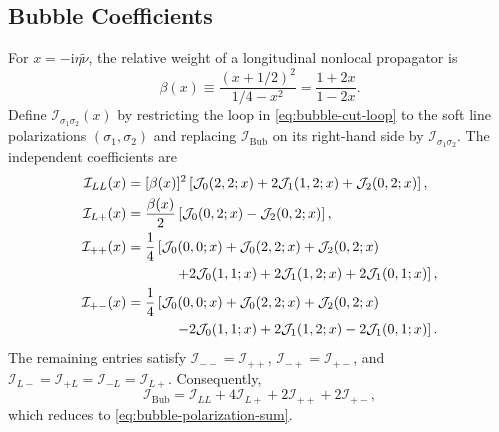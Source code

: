 \documentclass[a4paper,12pt]{article}
\def\ii{\mathrm{i}}
\begin{document}
\subsection{Bubble Coefficients}
\label{app:bubble-polarizations}
For $x=-\ii\eta\tilde\nu$, the relative weight of a longitudinal nonlocal propagator is
\begin{equation}
    \beta(x)\equiv\frac{(x+1/2)^2}{1/4-x^2}
    =\frac{1+2x}{1-2x}.
    \label{eq:bubble-longitudinal-weight}
\end{equation}
Define $\mathcal I_{\sigma_1\sigma_2}(x)$ by restricting the loop in \eqref{eq:bubble-cut-loop} to the soft line polarizations $(\sigma_1,\sigma_2)$ and replacing $\mathcal I_{\mathrm{Bub}}$ on its right-hand side by $\mathcal I_{\sigma_1\sigma_2}$.
The independent coefficients are
\begin{align}
    \mathcal I_{LL}(x)
    &=[\beta(x)]^2
    \left[\mathcal J_0(2,2;x)+2\mathcal J_1(1,2;x)
    +\mathcal J_2(0,2;x)\right],
    \label{eq:bubble-ILL}\\
    \mathcal I_{L+}(x)
    &=\frac{\beta(x)}2
    \left[\mathcal J_0(0,2;x)-\mathcal J_2(0,2;x)\right],
    \label{eq:bubble-ILplus}\\
    \mathcal I_{++}(x)
    &=\frac14\left[
    \mathcal J_0(0,0;x)+\mathcal J_0(2,2;x)
    +\mathcal J_2(0,2;x)\right.\nonumber\\
    &\hspace{12mm}\left.
    +2\mathcal J_0(1,1;x)+2\mathcal J_1(1,2;x)
    +2\mathcal J_1(0,1;x)\right],
    \label{eq:bubble-Iplusplus}\\
    \mathcal I_{+-}(x)
    &=\frac14\left[
    \mathcal J_0(0,0;x)+\mathcal J_0(2,2;x)
    +\mathcal J_2(0,2;x)\right.\nonumber\\
    &\hspace{12mm}\left.
    -2\mathcal J_0(1,1;x)+2\mathcal J_1(1,2;x)
    -2\mathcal J_1(0,1;x)\right].
    \label{eq:bubble-Iplusminus}
\end{align}
The remaining entries satisfy $\mathcal I_{--}=\mathcal I_{++}$, $\mathcal I_{-+}=\mathcal I_{+-}$, and $\mathcal I_{L-}=\mathcal I_{+L}=\mathcal I_{-L}=\mathcal I_{L+}$.
Consequently,
\begin{equation}
    \mathcal I_{\mathrm{Bub}}
    =\mathcal I_{LL}+4\mathcal I_{L+}
    +2\mathcal I_{++}+2\mathcal I_{+-},
    \label{eq:bubble-channel-sum}
\end{equation}
which reduces to \eqref{eq:bubble-polarization-sum}.
\end{document}
